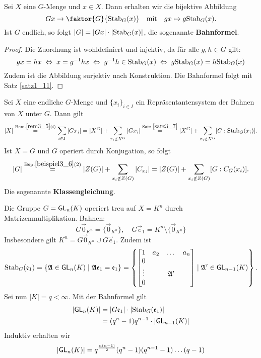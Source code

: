 \begin{satz}[Bahnensatz]\label{satz3_7}
	Sei $X$ eine $G$-Menge und $x \in X$. Dann erhalten wir die bijektive Abbildung 
	\[Gx \to \faktor{G}{\stab_G(x)}\quad\text{mit}\quad gx \mapsto g \stab_G(x).\]
	Ist $G$ endlich, so folgt $|G| = |Gx| \cdot |\mathrm{Stab}_G(x)|$, die sogenannte \textbf{Bahnformel}.
\end{satz}
\begin{proof}
	Die Zuordnung ist wohldefiniert und injektiv, da für alle $g, h \in G$ gilt: 
	\[gx = hx \;\Leftrightarrow\; x=g^{-1}hx \;\Leftrightarrow\; g^{-1}h \in \mathrm{Stab}_G(x) \;\Leftrightarrow\; g \mathrm{Stab}_G(x) = h \mathrm{Stab}_G(x)\]
	Zudem ist die Abbildung surjektiv nach Konstruktion. Die Bahnformel folgt mit Satz \ref{satz1_11}.
\end{proof}
\begin{kor}\label{kor3_8}
	Sei $X$ eine endliche $G$-Menge und $\{x_i\}_{i \in I}$ ein Repräsentantensystem der Bahnen von $X$ unter $G$. Dann gilt
	\[|X| \overset{\text{Bem.} \ref{rem3_5} (i)}{=}  \sum_{i \in I} |G{x_i}| = |X^G| + \sum_{x_i \notin X^G} |G{x_i}| \overset{\text{Satz.} \ref{satz3_7}}{=} |X^G| + \sum_{x_i \notin X^G} [G: \mathrm{Stab}_G(x_i)].\]
	Ist $X =G$ und $G$ operiert durch Konjugation, so folgt
	\[|G| \overset{\text{Bsp.} \ref{beispiel3_6} (2)}{=} |Z(G)| + \sum_{x_i \notin Z(G)} |C_{x_i}| = |Z(G)| + \sum_{x_i \notin Z(G)} [G : C_G(x_i)].\]
	Die sogenannte \textbf{Klassengleichung}.
\end{kor}
\begin{beispiel}\label{beispiel3_9}
	Die Gruppe $G = \mathsf{GL}_n(K)$ operiert treu auf $X = K^n$ durch Matrizenmultiplikation. Bahnen:
	\[G\vec{0}_{K^n} = \{\vec{0}_{K^n}\}, \quad G\vec{e}_1 = K^n \setminus \{\vec{0}_{K^n}\}\]
	Insbesondere gilt $K^n = G\vec{0}_{K^n} \cup G\vec{e}_1$. Zudem ist
	\[\mathrm{Stab}_G(\mathfrak{e}_1) = \{\mathfrak{A} \in \mathsf{GL}_n(K) \mid \mathfrak{A}\mathfrak{e}_1 = \mathfrak{e}_1\} = \left\{\begin{bmatrix}
		1 & a_2 & \dots & a_n\\
		0 & & & \\
		\vdots & & \mathfrak{A}' &\\
		0 & & &
	\end{bmatrix} \mid \mathfrak{A}' \in \mathsf{GL}_{n-1}(K)\right\}.\]
	Sei nun $|K| = q < \infty$. Mit der Bahnformel gilt
	\begin{align*}
		|\mathsf{GL}_n(K)| &= |G\mathfrak{e}_1| \cdot |\mathrm{Stab}_G(\mathfrak{e}_1)|\\
		&= (q^n - 1) q^{n-1} \cdot |\mathsf{GL}_{n-1}(K)|
	\end{align*}
	Induktiv erhalten wir
	\[|\mathsf{GL}_n(K)| = q^{\frac{n(n-1)}{2}} (q^n - 1)(q^{n-1} -1)\dots(q-1)\]
\end{beispiel}
